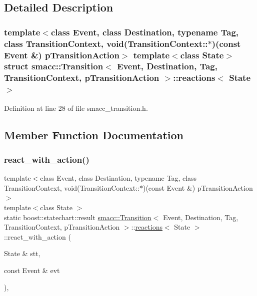 \subsection{Detailed Description}
\subsubsection*{template$<$class Event, class Destination, typename Tag, class Transition\+Context, void(\+Transition\+Context\+::$\ast$)(const Event \&) p\+Transition\+Action$>$\newline
template$<$class State$>$\newline
struct smacc\+::\+Transition$<$ Event, Destination, Tag, Transition\+Context, p\+Transition\+Action $>$\+::reactions$<$ State $>$}



Definition at line 28 of file smacc\+\_\+transition.\+h.



\subsection{Member Function Documentation}
\mbox{\label{structsmacc_1_1Transition_1_1reactions_a843ddc3d10e2aec66a702745852455c3}} 
\subsubsection{\texorpdfstring{react\+\_\+with\+\_\+action()}{react\_with\_action()}}
{\footnotesize\ttfamily template$<$class Event, class Destination, typename Tag, class Transition\+Context, void(\+Transition\+Context\+::$\ast$)(const Event \&) p\+Transition\+Action$>$ \\
template$<$class State $>$ \\
static boost\+::statechart\+::result \hyperlink{classsmacc_1_1Transition}{smacc\+::\+Transition}$<$ Event, Destination, Tag, Transition\+Context, p\+Transition\+Action $>$\+::\hyperlink{structsmacc_1_1Transition_1_1reactions}{reactions}$<$ State $>$\+::react\+\_\+with\+\_\+action (\begin{DoxyParamCaption}\item[{State \&}]{stt,  }\item[{const Event \&}]{evt }\end{DoxyParamCaption})\hspace{0.3cm}{\ttfamily [inline]}, {\ttfamily [static]}}



